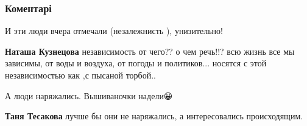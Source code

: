 
 
 
 
 
\subsubsection{Коментарі}

\begin{itemize}
 
И эти люди вчера отмечали (незалежнисть ), унизительно!

\begin{itemize}
 
\textbf{Наташа Кузнецова} независимость от чего?? о чем речь!!? всю жизнь все мы
зависимы, от воды и воздуха, от погоды и политиков... носятся с этой
независимостью как ,с пысаной торбой..
\end{itemize}

 
А люди наряжались. Вышиваночки надели😀

\begin{itemize}
 
\textbf{Таня Тесакова} лучше бы они не наряжались, а интересовались происходящим.


\end{itemize}
\end{itemize}
